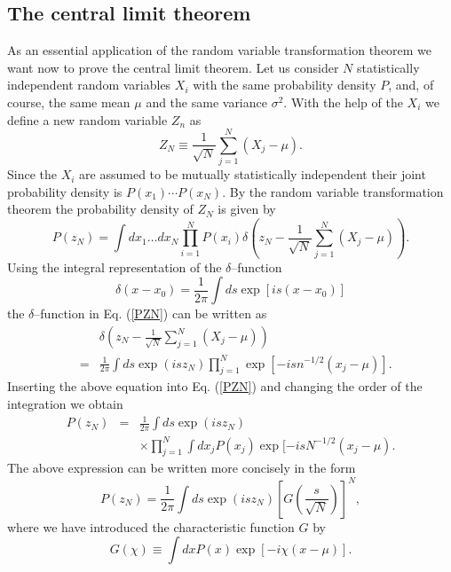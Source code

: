\subsection{The central limit theorem}
As an essential application of the random variable transformation 
theorem we want now to prove the central limit theorem.
Let us consider $N$ statistically independent random variables $X_i$
with the same probability density $P$, and, of course, the same mean $\mu$
and the same variance $\sigma^2$. With the help of the $X_i$ we 
define a new random variable $Z_n$ as
\begin{equation}
Z_N \equiv \frac{1}{\sqrt{N}} \sum_{j=1}^N (X_j - \mu).
\end{equation}
Since the $X_i$ are assumed to be mutually statistically 
independent their joint probability density is
$P(x_1) \cdots P(x_N)$. By the random variable transformation 
theorem the probability density of $Z_N$ is given by
\begin{equation}\label{PZN}
P(z_N) = \int dx_1 \ldots dx_N \prod_{i=1}^N P(x_i) 
    \delta\left(z_N -\frac{1}{\sqrt{N}} \sum_{j=1}^N (X_j -\mu) 
    \right).
\end{equation}
Using the integral representation of the $\delta$--function
\begin{equation}
\delta(x-x_0) = \frac{1}{2\pi} \int ds \exp[is(x-x_0)]
\end{equation}
the $\delta$--function in Eq. (\ref{PZN}) can be written as
\begin{eqnarray}
&&\delta\left(z_N -\frac{1}{\sqrt{N}} \sum_{j=1}^N (X_j -\mu) 
    \right) \\
&=& \frac{1}{2\pi} \int ds \exp(isz_N) \prod_{j=1}^N 
    \exp[-isn^{-1/2}(x_j - \mu)].
\end{eqnarray}
Inserting the above equation into Eq. (\ref{PZN}) and changing the 
order of the integration we obtain
\begin{eqnarray}
P(z_N) &=& \frac{1}{2 \pi} \int ds \exp(isz_N) \nonumber \\
    & & \times \prod_{j=1}^N \int dx_j P(x_j) 
        \exp[-isN^{-1/2}(x_j - \mu).
\end{eqnarray}
The above expression can be written more concisely in the form
\begin{equation}\label{PZMITG}
P(z_N) = \frac{1}{2\pi} \int ds \exp(isz_N) 
[G(\frac{s}{\sqrt{N}})]^N,
\end{equation}
where we have introduced the characteristic function $G$ by
\begin{equation}
G(\chi) \equiv \int dx P(x) \exp[-i\chi(x-\mu)].
\end{equation}
